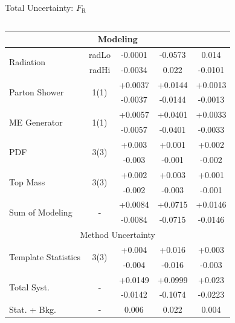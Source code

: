 \documentclass{beamer}
\newcommand*{\fr}{\ensuremath{F_{\text{R}}}\xspace}
\begin{document}
{\begin{frame}{Total Uncertainty: \fr}
\begin{columns}
\begin{table}[h!]
\begin{tabular}{lcccc}
          \hline
          \multicolumn{5}{c}{Modeling} \\\hline
          \multirow{2}{*}{Radiation} & radLo & -0.0001 & -0.0573 & 0.014\\
                                 & radHi & -0.0034 & 0.022 & -0.0101\\ \hline
          \multirow{2}{*}{Parton Shower} & \multirow{2}{*}{1(1)} & +0.0037 & +0.0144 & +0.0013\\
                                 &                       & -0.0037 & -0.0144 & -0.0013\\\hline
          \multirow{2}{*}{ME Generator} & \multirow{2}{*}{1(1)} & +0.0057 & +0.0401 & +0.0033\\
                                 &                       & -0.0057 & -0.0401 & -0.0033\\\hline
          \multirow{2}{*}{PDF} & \multirow{2}{*}{3(3)} & +0.003 & +0.001 & +0.002\\
                                 &                       & -0.003 & -0.001 & -0.002\\\hline
          \multirow{2}{*}{Top Mass} & \multirow{2}{*}{3(3)} & +0.002 & +0.003 & +0.001\\
                                 &                       & -0.002 & -0.003 & -0.001\\\hline
          
          \hline\hline
          \multirow{2}{*}{Sum of Modeling} & \multirow{2}{*}{-} & +0.0084 & +0.0715 & +0.0146\\
                                 &                       & -0.0084 & -0.0715 & -0.0146\\\hline
          
          \hline
          \multicolumn{5}{c}{Method Uncertainty} \\\hline
          \multirow{2}{*}{Template Statistics} & \multirow{2}{*}{3(3)} & +0.004 & +0.016 & +0.003\\
                                 &                       & -0.004 & -0.016 & -0.003\\\hline
          
          \hline\hline
          \multirow{2}{*}{Total Syst.} & \multirow{2}{*}{-} & +0.0149 & +0.0999 & +0.023\\
                                 &                       & -0.0142 & -0.1074 & -0.0223\\\hline
          Stat. + Bkg. & - & 0.006 & 0.022 & 0.004 \\\hline
          

\end{tabular}
\end{table}
\end{columns}
\end{frame}}
\end{document}
